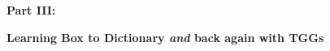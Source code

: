 \vspace*{2cm}

{\bf \huge Part III:}
\vspace{1cm}

{\bf \Huge Learning Box to Dictionary \emph{and} back again with TGGs }
\vspace{1cm}















